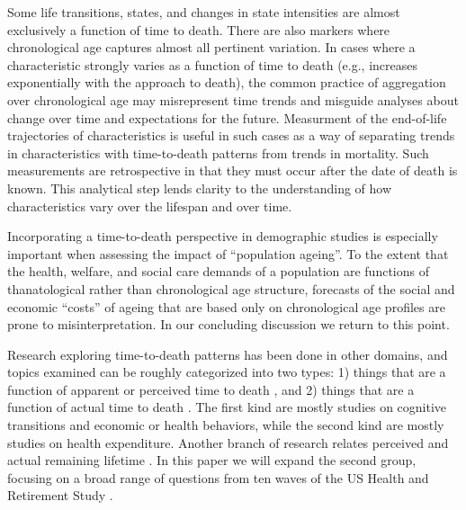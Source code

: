 \documentclass{article}
\begin{document}
Some life
transitions, states, and changes in state intensities are almost exclusively a
function of time to death. There are also markers where chronological age
captures almost all pertinent variation. In cases where a characteristic strongly varies as a
function of time to death (e.g., increases exponentially with the approach to death),
the common practice of aggregation over chronological age may misrepresent time
trends and misguide analyses about change over time and expectations for the
future.  Measurment of the
end-of-life trajectories of characteristics is useful in such cases as a way of separating
trends in characteristics with time-to-death patterns from trends in mortality.
Such measurements are retrospective in that they must occur after the date
of death is known. This analytical step lends clarity to the understanding of
how characteristics vary over the lifespan and over time.

Incorporating a time-to-death perspective in demographic studies is especially
important when assessing the impact of ``population ageing''.
To the extent that the health, welfare, and social care demands of a
population are functions of thanatological rather than chronological age
structure, forecasts of the social and economic ``costs'' of ageing that are
based only on chronological age profiles are prone to misinterpretation.
In our concluding discussion we return to this point.

Research exploring time-to-death patterns has been done in other
domains, and topics examined can be roughly categorized into two types: 1) things that are a
function of apparent or perceived time to death
\citep{hamermesh1985expectations,hurd1995evaluation,carstensen2006influence,gan2004subjective,biro2010subjective,salm2010subjective,van2010living,cocco2012longevity,payne2013life,balia2013survival},
and 2) things that are a function of actual time to death
\citep{miller2001increasing,seshamani2004longitudinal,werblow2007population}.
The first kind are mostly studies on cognitive transitions and economic or
health behaviors, while the second kind are mostly studies on health
expenditure.
Another branch of research relates perceived and actual remaining lifetime
\citep{perozek2008using,delavande2011differential,post2012longevity,kutlu2013individuals}.
In this paper we will expand the second group, focusing on a broad range of
questions from ten waves of the US Health and Retirement Study \citep{HRS}.

\end{document}
